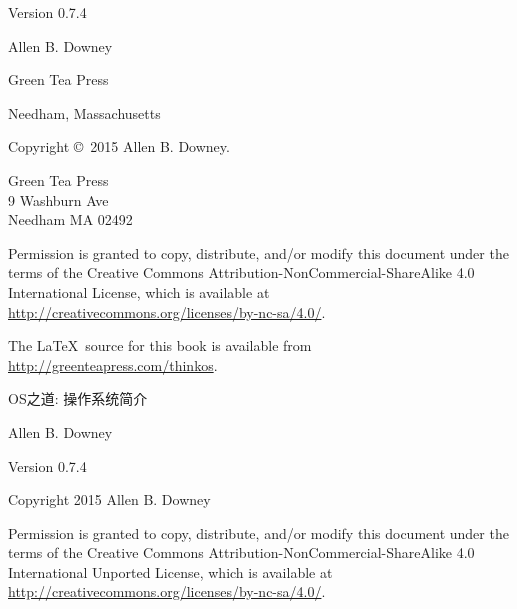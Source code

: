 \documentclass[12pt]{book}
\newcommand{\thetitle}{OS之道}
\newcommand{\thesubtitle}{操作系统简介}
\newcommand{\theversion}{0.7.4}
\begin{document}
\begin{latexonly}
\begin{flushright}
\vspace{0.25in}

Version \theversion

\vspace{1in}


{\Large
	Allen B. Downey\\
}


\vspace{0.5in}

{\Large Green Tea Press}

{\small Needham, Massachusetts}

\vfill

\end{flushright}


\pagebreak
\thispagestyle{empty}

Copyright \copyright ~2015 Allen B. Downey.


\vspace{0.2in}

\begin{flushleft}
Green Tea Press       \\
9 Washburn Ave \\
Needham MA 02492
\end{flushleft}

Permission is granted to copy, distribute, and/or modify this document
under the terms of the Creative Commons
Attribution-NonCommercial-ShareAlike 4.0 International License, which
is available at
\url{http://creativecommons.org/licenses/by-nc-sa/4.0/}.


The \LaTeX\ source for this book is available from
\url{http://greenteapress.com/thinkos}.

\vspace{0.2in}

\end{latexonly}



\begin{htmlonly}


{\Large \thetitle: \thesubtitle}

{\large Allen B. Downey}

Version \theversion

\vspace{0.25in}

Copyright 2015 Allen B. Downey

\vspace{0.25in}

Permission is granted to copy, distribute, and/or modify this document
under the terms of the Creative Commons 
Attribution-NonCommercial-ShareAlike 4.0 International
Unported License, which is available at
\url{http://creativecommons.org/licenses/by-nc-sa/4.0/}.

\setcounter{chapter}{-1}

\end{htmlonly}
\end{document}
